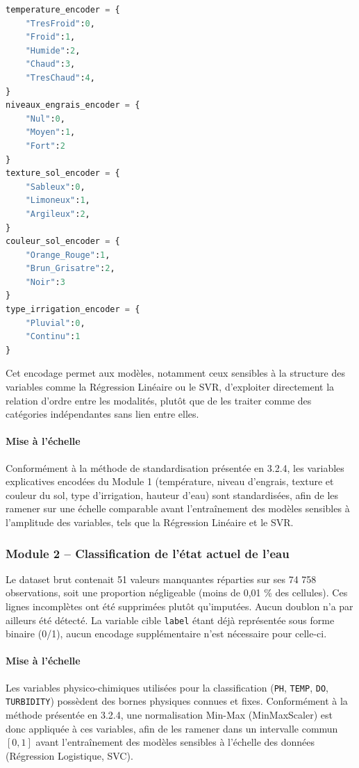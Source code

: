 \documentclass[a4paper,12pt, oneside]{article}
\begin{document}
\begin{lstlisting}[language=Python]
temperature_encoder = {
    "TresFroid":0,
    "Froid":1,
    "Humide":2,
    "Chaud":3,
    "TresChaud":4,
}
niveaux_engrais_encoder = {
    "Nul":0,
    "Moyen":1,
    "Fort":2
}
texture_sol_encoder = {
    "Sableux":0,
    "Limoneux":1,
    "Argileux":2,
}
couleur_sol_encoder = {
    "Orange_Rouge":1,
    "Brun_Grisatre":2,
    "Noir":3
}
type_irrigation_encoder = {
    "Pluvial":0,
    "Continu":1
}
\end{lstlisting}

Cet encodage permet aux modèles, notamment ceux sensibles à la structure des variables comme la Régression Linéaire ou le SVR, d'exploiter directement la relation d'ordre entre les modalités, plutôt que de les traiter comme des catégories indépendantes sans lien entre elles.

\paragraph{Mise à l'échelle\\}
Conformément à la méthode de standardisation présentée en 3.2.4, les variables explicatives encodées du Module 1 (température, niveau d'engrais, texture et couleur du sol, type d'irrigation, hauteur d'eau) sont standardisées, afin de les ramener sur une échelle comparable avant l'entraînement des modèles sensibles à l'amplitude des variables, tels que la Régression Linéaire et le SVR.


\subsubsection[Module 2]{Module 2 -- Classification de l'état actuel de l'eau\\}
Le dataset brut contenait 51 valeurs manquantes réparties sur ses 74 758 observations, soit une proportion négligeable (moins de 0,01 \% des cellules). Ces lignes incomplètes ont été supprimées plutôt qu'imputées. Aucun doublon n'a par ailleurs été détecté. La variable cible \texttt{label} étant déjà représentée sous forme binaire (0/1), aucun encodage supplémentaire n'est nécessaire pour celle-ci.

\paragraph{Mise à l'échelle\\}
Les variables physico-chimiques utilisées pour la classification (\texttt{PH}, \texttt{TEMP}, \texttt{DO}, \texttt{TURBIDITY}) possèdent des bornes physiques connues et fixes. Conformément à la méthode présentée en 3.2.4, une normalisation Min-Max (MinMaxScaler) est donc appliquée à ces variables, afin de les ramener dans un intervalle commun $[0,1]$ avant l'entraînement des modèles sensibles à l'échelle des données (Régression Logistique, SVC).
\end{document}
